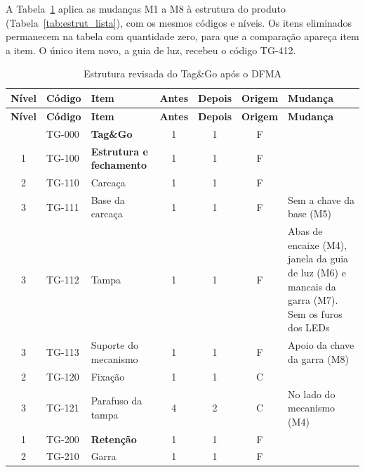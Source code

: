 A Tabela~\ref{tab:dfma_estrutura} aplica as mudanças M1 a M8 à estrutura do produto (Tabela~\ref{tab:estrut_lista}), com os mesmos códigos e níveis. Os itens eliminados permanecem na tabela com quantidade zero, para que a comparação apareça item a item. O único item novo, a guia de luz, recebeu o código TG-412.

\begingroup
\footnotesize
\renewcommand{\arraystretch}{1.25}
\begin{longtable}{@{}c l >{\RaggedRight\arraybackslash}p{4.2cm} c c c >{\RaggedRight\arraybackslash}p{4.2cm}@{}}
    \caption{Estrutura revisada do Tag\&Go após o DFMA}\label{tab:dfma_estrutura}\\
    \toprule
    \textbf{Nível} & \textbf{Código} & \textbf{Item} & \textbf{Antes} & \textbf{Depois} & \textbf{Origem} & \textbf{Mudança} \\
    \midrule
    \endfirsthead
    \toprule
    \textbf{Nível} & \textbf{Código} & \textbf{Item} & \textbf{Antes} & \textbf{Depois} & \textbf{Origem} & \textbf{Mudança} \\
    \midrule
    \endhead
    \bottomrule
    \endfoot
    0 & TG-000 & \textbf{Tag\&Go} & 1 & 1 & F & \\
    \midrule
    1 & TG-100 & \textbf{Estrutura e fechamento} & 1 & 1 & F & \\
    2 & TG-110 & \hspace{0.3cm}Carcaça & 1 & 1 & F & \\
    3 & TG-111 & \hspace{0.6cm}Base da carcaça & 1 & 1 & F & Sem a chave da base (M5) \\
    3 & TG-112 & \hspace{0.6cm}Tampa & 1 & 1 & F & Abas de encaixe (M4), janela da guia de luz (M6) e mancais da garra (M7). Sem os furos dos LEDs \\
    3 & TG-113 & \hspace{0.6cm}Suporte do mecanismo & 1 & 1 & F & Apoio da chave da garra (M8) \\
    2 & TG-120 & \hspace{0.3cm}Fixação & 1 & 1 & C & \\
    3 & TG-121 & \hspace{0.6cm}Parafuso da tampa & 4 & 2 & C & No lado do mecanismo (M4) \\
    \midrule
    1 & TG-200 & \textbf{Retenção} & 1 & 1 & F & \\
    2 & TG-210 & \hspace{0.3cm}Garra & 1 & 1 & F & \\

\end{longtable}
